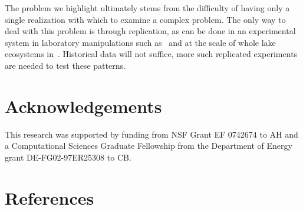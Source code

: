 \documentclass[authoryear,review,12pt]{elsarticle}
\begin{document}
The problem we highlight ultimately stems from the difficulty of having
only a single realization with which to examine a complex problem.
The only way to deal with this problem is through replication, as
can be done in an experimental system in laboratory manipulations
such as~\citet{Drake2010, Veraart2011} and at the scale of whole lake
ecosystems in~\citet{Carpenter2011}.  Historical data will not suffice,
more such replicated experiments are needed to test these patterns.



 \section{Acknowledgements}
This research was supported by funding from NSF Grant EF 0742674 to AH
and a Computational Sciences Graduate Fellowship from the Department of Energy grant DE-FG02-97ER25308 to CB. 
 \section{References}%
 
 
\end{document}
